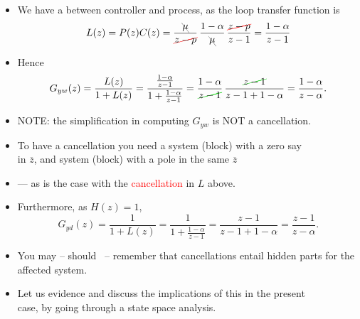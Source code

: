 \begin{frame}
\framesubtitleTC{}
\myPause
 \begin{itemize}[<+-| alert@+>]
 \item We have a  between controller and process, as the loop transfer function is
       \begin{displaymath}
        L(z) = P(z)C(z)
             = \frac{\cbcancel[gray]{\mu}}{\ccancel[red]{z-p}} \,
               \frac{1-\alpha}{\cbcancel[gray]{\mu}} \, \frac{\ccancel[red]{z-p}}{z-1}
             = \frac{1-\alpha}{z-1}
       \end{displaymath}
 \item Hence
       \begin{displaymath}
        G_{yw}(z) = \frac{L(z)}{1+L(z)}
                  = \frac{\frac{1-\alpha}{z-1}}{1+\frac{1-\alpha}{z-1}}
                  = \frac{1-\alpha}{\ccancel[green!80!black]{z-1}} \,
                    \frac{\ccancel[green!80!black]{z-1}}{z-1+1-\alpha}
                  = \frac{1-\alpha}{z-\alpha}.
       \end{displaymath}
 \item NOTE: the \textcolor{green!80!black}{simplification} in computing $G_{yw}$ is NOT a cancellation.
 \item[] \vspace{-0.75mm}To have a cancellation you need a system (block) with a zero say\\
       in $\overline{z}$, and  system (block) with a pole in the same  $\overline{z}$\\
 \item[] \vspace{-0.75mm} --- as is the case with the \textcolor{red}{cancellation} in $L$ above.
 \end{itemize}
\end{frame}

\begin{frame}
\framesubtitleTC{}
\myPause
 \begin{itemize}[<+-| alert@+>]
 \item Furthermore, as $H(z)=1$,
       \begin{displaymath}
        G_{yd}(z) = \frac{1}{1+L(z)}
                  = \frac{1}{1+\frac{1-\alpha}{z-1}}
                  = \frac{z-1}{z-1+1-\alpha}
                  = \frac{z-1}{z-\alpha}.
       \end{displaymath}
 \item You may -- should \smiley$\,$ -- remember that cancellations entail hidden parts for the affected system.
 \item Let us evidence and discuss the implications of this in the present\\
       case, by going through a state space analysis.
 \end{itemize}
\end{frame}

